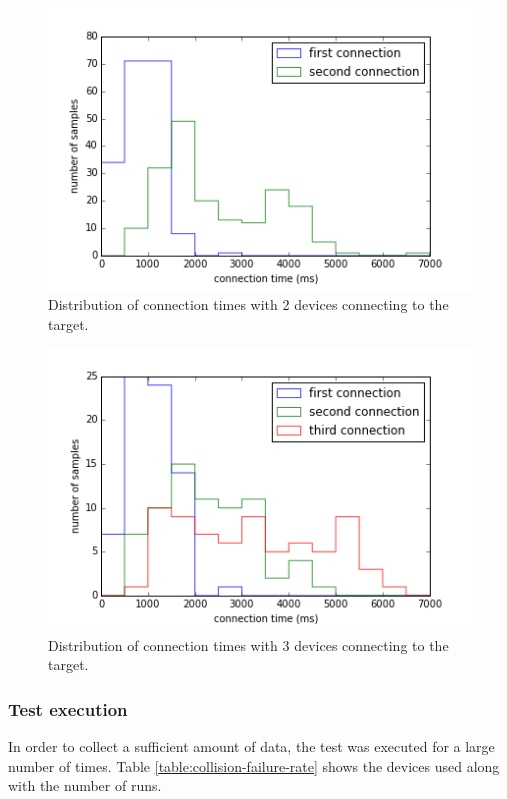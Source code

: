 \begin{figure}[ht!]
  \centering
  \includegraphics[width=1.0\textwidth]{application/img/collision_2.png}
  \caption{Distribution of connection times with 2 devices connecting to the target.}
  \label{figure:collision_2}
\end{figure}

\begin{figure}[ht!]
  \centering
  \includegraphics[width=1.0\textwidth]{application/img/collision_3.png}
  \caption{Distribution of connection times with 3 devices connecting to the target.}
  \label{figure:collision_3}
\end{figure}


\subsubsection{Test execution}
In order to collect a sufficient amount of data, the test was executed for a large number of times.
Table \ref{table:collision-failure-rate} shows the devices used along with the number of runs.

